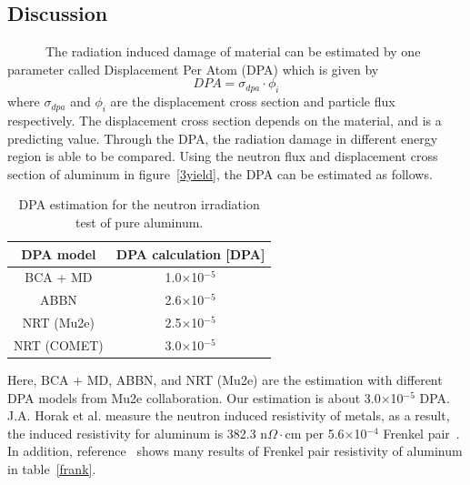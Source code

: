  \subsection{Discussion}
~~~~~~The radiation induced damage of material can be estimated by one parameter called Displacement Per Atom (DPA) which is given by
\begin{equation}
 DPA = \sigma_{dpa} \cdot \phi_i
\end{equation}
where $\sigma_{dpa}$ and $\phi_i$ are the displacement cross section and particle flux respectively.
The displacement cross section depends on the material, and is a predicting value.
Through the DPA, the radiation damage in different energy region is able to be compared.
Using the neutron flux and displacement cross section of aluminum in figure~\ref{3yield}, the DPA can be estimated as follows.
\begin{table}[H]
 \centering
 \begin{tabular}{cc} \hline \hline
  DPA model & DPA calculation [DPA] \\ \hline
  BCA + MD & 1.0$\times$10$^{-5}$ \\
  ABBN & 2.6$\times$10$^{-5}$ \\
  NRT (Mu2e) & 2.5$\times$10$^{-5}$ \\
  NRT (COMET) & 3.0$\times$10$^{-5}$ \\ \hline \hline
 \end{tabular}
 \caption{DPA estimation for the neutron irradiation test of pure aluminum.}
\end{table}
Here, BCA + MD, ABBN, and NRT (Mu2e) are the estimation with different DPA models from Mu2e collaboration.
Our estimation is about 3.0$\times$10$^{-5}$ DPA.
J.A. Horak et al. measure the neutron induced resistivity of metals, as a result, the induced resistivity for aluminum is 382.3 n$\Omega\cdot$cm per 5.6$\times$10$^{-4}$ Frenkel pair~\cite{horak}.
In addition, reference~\cite{yu} shows many results of Frenkel pair resistivity of aluminum in table~\ref{frank}.
